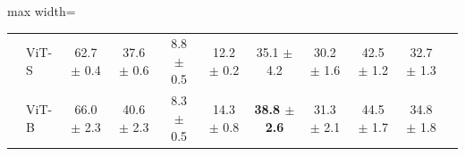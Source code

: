 \begin{table}[t]
\begin{adjustbox}{max width=\textwidth}
\begin{tabular}{l l c c c c c c c c c}
 & ViT-S & 62.7 {\scriptsize$\pm$ 0.4} & 37.6 {\scriptsize$\pm$ 0.6} & 8.8 {\scriptsize$\pm$ 0.5} & 12.2 {\scriptsize$\pm$ 0.2} & 35.1 {\scriptsize$\pm$ 4.2} & 30.2 {\scriptsize$\pm$ 1.6} & 42.5 {\scriptsize$\pm$ 1.2} & 32.7 {\scriptsize$\pm$ 1.3} \\
 & ViT-B & 66.0 {\scriptsize$\pm$ 2.3} & 40.6 {\scriptsize$\pm$ 2.3} & 8.3 {\scriptsize$\pm$ 0.5} & 14.3 {\scriptsize$\pm$ 0.8} & \textbf{38.8 {\scriptsize$\pm$ 2.6}} & 31.3 {\scriptsize$\pm$ 2.1} & 44.5 {\scriptsize$\pm$ 1.7} & 34.8 {\scriptsize$\pm$ 1.8} \\
\bottomrule
\end{tabular}
\end{adjustbox}
\end{table}
